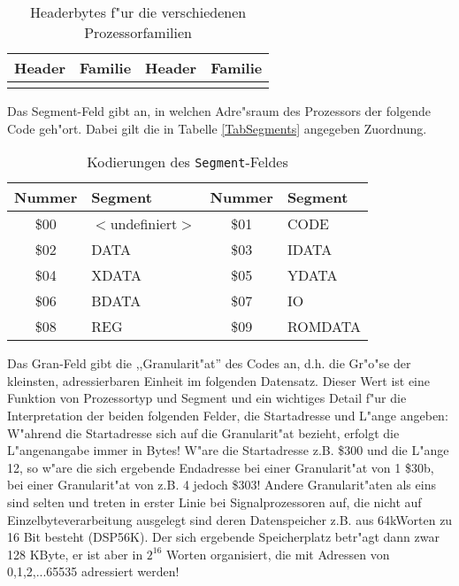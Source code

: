 \documentclass[12pt,a4paper,twoside]{report}
\begin{document}
\begin{center}\begin{longtable}{|c|l||c|l|}
\hline
Header & Familie & Header & Familie \\
\hline
\hline
\endhead

\hline
\caption{Headerbytes f"ur die verschiedenen Prozessorfamilien}
\label{TabHeader}
\end{longtable}\end{center}

Das Segment-Feld gibt an, in welchen Adre"sraum des Prozessors der
folgende Code geh"ort.  Dabei gilt die in Tabelle \ref{TabSegments}
angegeben Zuordnung.
\begin{table*}[htbp]
\begin{center}\begin{tabular}{|c|l||c|l|}
\hline
Nummer & Segment & Nummer & Segment \\
\hline
\hline
\$00 &    $<$undefiniert$>$    & \$01 &    CODE \\
\$02 &    DATA                 & \$03 &    IDATA \\
\$04 &    XDATA                & \$05 &    YDATA \\
\$06 &    BDATA                & \$07 &    IO \\
\$08 &    REG                  & \$09 &    ROMDATA \\
\hline
\end{tabular}\end{center}
\caption{Kodierungen des {\tt Segment}-Feldes\label{TabSegments}
         \label{TabSegmentNums}}
\end{table*}
Das Gran-Feld gibt die ,,Granularit"at'' des Codes an, d.h. die Gr"o"se
der kleinsten, adressierbaren Einheit im folgenden Datensatz.  Dieser
Wert ist eine Funktion von Prozessortyp und Segment und ein wichtiges
Detail f"ur die Interpretation der beiden folgenden Felder, die
Startadresse und L"ange angeben: W"ahrend die Startadresse sich auf die
Granularit"at bezieht, erfolgt die L"angenangabe immer in Bytes!  W"are
die Startadresse z.B. \$300 und die L"ange 12, so w"are die sich
ergebende Endadresse bei einer Granularit"at von 1 \$30b, bei einer
Granularit"at von z.B. 4 jedoch \$303!  Andere Granularit"aten als eins
sind selten und treten in erster Linie bei Signalprozessoren auf, die
nicht  auf Einzelbyteverarbeitung ausgelegt sind deren Datenspeicher z.B.
aus 64kWorten zu 16 Bit besteht (DSP56K).  Der sich ergebende Speicherplatz
betr"agt dann zwar 128 KByte, er ist aber in $2^{16}$ Worten organisiert,
die mit Adressen von 0,1,2,...65535 adressiert werden!
\end{document}
